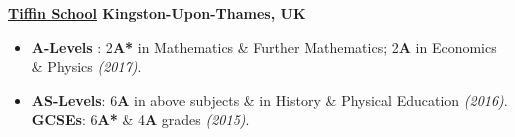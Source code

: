 \documentclass[10pt,a4paper,roman]{moderncv}
\begin{document}
\vspace*{0.4mm}

\textbf{\href{http://www.tiffinschool.co.uk/home.html}{Tiffin School} \enspace \enspace  \enspace  \enspace  \enspace  \enspace  \enspace  \enspace \enspace  \enspace \enspace  \enspace  \enspace  \enspace  \enspace  \enspace  \enspace \enspace \enspace  \enspace   \enspace \enspace  \enspace  \enspace  \enspace  \enspace  \enspace  \enspace \enspace  \enspace  \enspace \enspace \enspace  \enspace  \enspace  \enspace  \enspace  \enspace  \enspace \enspace  \enspace  \enspace \enspace \enspace  \enspace  \enspace  \enspace  \enspace  \enspace  \enspace \enspace  \enspace  \enspace \enspace \enspace  \enspace  \enspace  \enspace  \enspace  \enspace   \enspace  \enspace  \enspace  \enspace  \enspace  \enspace   \enspace  \enspace   \enspace Kingston-Upon-Thames, UK}
\small
{\begin{itemize}
    \item \textbf{A-Levels }: 2\textbf{A*} in Mathematics \& Further Mathematics;  2\textbf{A} in Economics \& Physics \textit{(2017)}.
    \item \textbf{AS-Levels}:  6\textbf{A} in above subjects \& in History \& Physical Education \textit{(2016)}. \textbf{GCSEs}: 6\textbf{A*} \& 4\textbf{A} grades \textit{(2015)}.	
    \end{itemize}}

\vspace*{-3mm}
\end{document}
